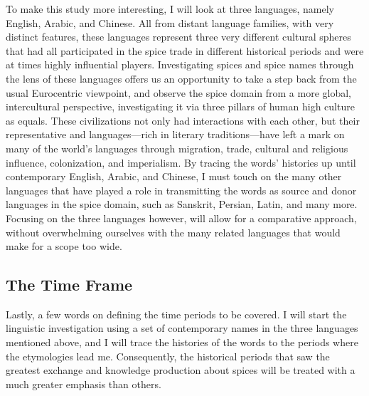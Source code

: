 To make this study more interesting, I will look at three languages, namely English, Arabic, and Chinese. All from distant language families, with very distinct features, these languages represent three very different cultural spheres that had all participated in the spice trade in different historical periods and were at times highly influential players. Investigating spices and spice names through the lens of these languages offers us an opportunity to take a step back from the usual Eurocentric viewpoint, and observe the spice domain from a more global, intercultural perspective, investigating it via three pillars of human high culture as equals. These civilizations not only had interactions with each other, but their representative and languages---rich in literary traditions---have left a mark on many of the world's languages through migration, trade, cultural and religious influence, colonization, and imperialism. By tracing the words' histories up until contemporary English, Arabic, and Chinese, I must touch on the many other languages that have played a role in transmitting the words as source and donor languages in the spice domain, such as Sanskrit, Persian, Latin, and many more. Focusing on the three languages however, will allow for a comparative approach, without overwhelming ourselves with the many related languages that would make for a scope too wide.


\subsection{The Time Frame}

Lastly, a few words on defining the time periods to be covered. I will start the linguistic investigation using a set of contemporary names in the three languages mentioned above, and I will trace the histories of the words to the periods where the etymologies lead me. Consequently, the historical periods that saw the greatest exchange and knowledge production about spices will be treated with a much greater emphasis than others.

